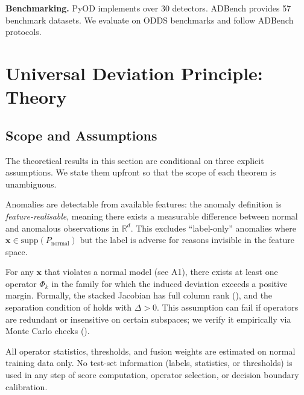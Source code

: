 \documentclass{article}
\newcommand{\R}{\mathbb{R}}
\begin{document}
\textbf{Benchmarking.} PyOD \citep{zhao2019pyod} implements over 30 detectors. ADBench \citep{han2022adbench} provides 57 benchmark datasets. We evaluate on ODDS benchmarks \citep{rayana2016odds} and follow ADBench protocols.

\section{Universal Deviation Principle: Theory}
\label{sec:theory}

\subsection{Scope and Assumptions}

The theoretical results in this section are conditional on three explicit assumptions. We state them upfront so that the scope of each theorem is unambiguous.

\begin{description}[leftmargin=*,labelwidth=1.8cm]
\item[A1 (Observability)] Anomalies are detectable from available features: the anomaly definition is \emph{feature-realisable}, meaning there exists a measurable difference between normal and anomalous observations in $\R^d$. This excludes ``label-only'' anomalies where $\mathbf{x} \in \mathrm{supp}(P_{\text{normal}})$ but the label is adverse for reasons invisible in the feature space.
\item[A2 (Operator-family richness)] For any $\mathbf{x}$ that violates a normal model (see A1), there exists at least one operator $\Phi_k$ in the family for which the induced deviation exceeds a positive margin. Formally, the stacked Jacobian has full column rank (), and the separation condition of  holds with $\Delta > 0$. This assumption can fail if operators are redundant or insensitive on certain subspaces; we verify it empirically via Monte Carlo checks ().
\item[A3 (Calibration discipline)] All operator statistics, thresholds, and fusion weights are estimated on normal training data only. No test-set information (labels, statistics, or thresholds) is used in any step of score computation, operator selection, or decision boundary calibration.
\end{description}
\end{document}
